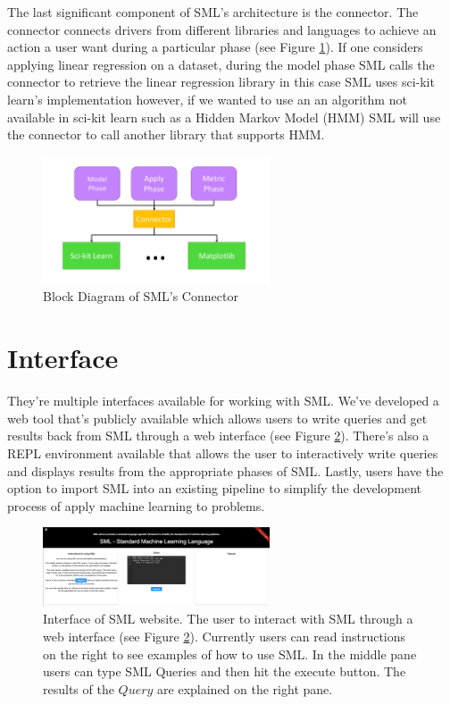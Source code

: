 \documentclass[jair,twoside,11pt,theapa]{article}
\begin{document}
The last significant component of SML's architecture is the connector. The connector connects drivers from different libraries and languages to achieve an action a user want during a particular phase (see Figure \ref{fig:SML:Connector}). If one considers applying linear regression on a dataset, during the model phase SML calls the connector to retrieve the linear regression library in this case SML uses sci-kit learn's implementation however, if we wanted to use an an algorithm not available in sci-kit learn such as a Hidden Markov Model (HMM) SML will use the connector to call another library that supports HMM.

\begin{figure}
\includegraphics[width=0.6\textwidth]{figs/connector.png}
\centering
\caption{Block Diagram of SML's Connector}
\label{fig:SML:Connector}
\end{figure}

\section{Interface}
\label{interface}

They're multiple interfaces available for working with SML. We've developed a web tool that's publicly available which allows users to write queries and get results back from SML through a web interface (see Figure \ref{fig:SML:website}). There's also a REPL environment available that allows the user to interactively write queries and displays results from the appropriate phases of SML. Lastly, users have the option to import SML into an existing pipeline to simplify the development process of apply machine learning to problems.

\begin{figure}
\includegraphics[width=0.6\textwidth]{figs/sml-web-site.png}
\centering
\caption{Interface of SML website. The user to interact with SML through a web interface (see Figure \ref{fig:SML:website}). Currently users can read instructions on the right to see examples of how to use SML. In the middle pane users can type SML Queries and then hit the execute button. The results of the \(Query\) are explained on the right pane.}
\label{fig:SML:website}
\end{figure}
\end{document}
